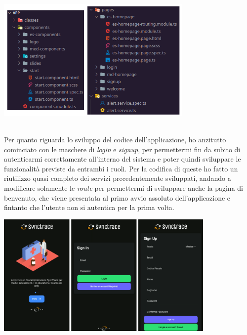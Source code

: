 \begin{minipage}{\linewidth}
  \centering
    \includegraphics[height=6cm]{immagini/directory}
\end{minipage} \\

Per quanto riguarda lo sviluppo del codice dell'applicazione, ho anzitutto cominciato con le maschere di \textit{login} e \textit{signup}, per permettermi fin da subito di autenticarmi correttamente all'interno del sistema e poter quindi sviluppare le funzionalità previste da entrambi i ruoli. Per la codifica di queste ho fatto un riutilizzo quasi completo dei servizi precedentemente sviluppati, andando a modificare solamente le \textit{route} per permettermi di sviluppare anche la pagina di benvenuto, che viene presentata al primo avvio assoluto dell'applicazione e fintanto che l'utente non si autentica per la prima volta.\\

\begin{minipage}{\linewidth}
  \centering
    \includegraphics[height=6cm]{immagini/app/welcomeloginsignup}
\end{minipage}\\

